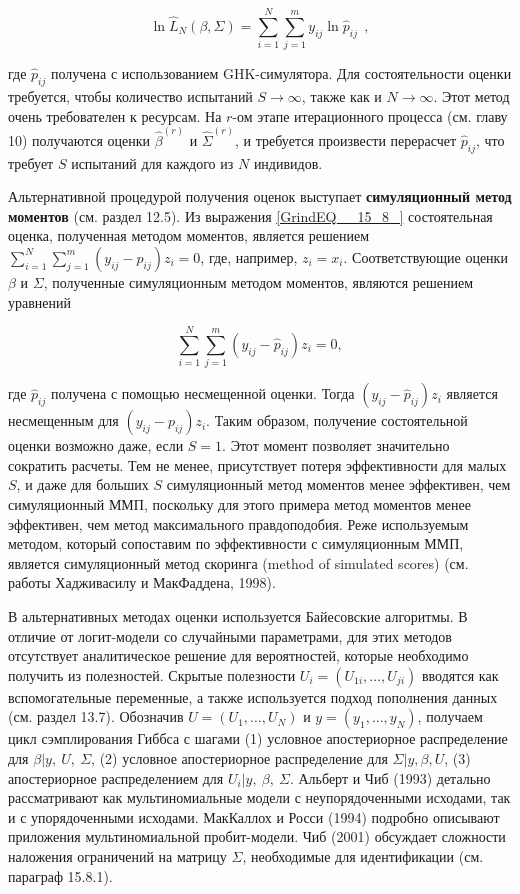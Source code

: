 \[{\ln  {\hat{L}}_N(\beta ,\Sigma )=\sum^N_{i=1}{\sum^m_{j=1}{y_{ij}{\ln  {\hat{p}}_{ij}\ }}}\ },\] 

где ${\hat{p}}_{ij}$ получена с использованием GHK-симулятора. Для состоятельности оценки требуется, чтобы количество испытаний  $S\to \infty $, также как и $N\to \infty $. Этот метод очень требователен к ресурсам. На $r$-ом этапе итерационного процесса (см. главу 10) получаются оценки ${\widehat{\beta }}^{(r)}$ и ${\widehat{\Sigma }}^{(r)}$, и требуется произвести перерасчет ${\hat{p}}_{ij}$, что требует $S$ испытаний для каждого из $N$ индивидов.

Альтернативной процедурой получения оценок выступает \textbf{симуляционный метод моментов} (см. раздел 12.5). Из выражения \eqref{GrindEQ__15_8_} состоятельная оценка, полученная методом моментов, является решением $\sum^N_{i=1}{\sum^m_{j=1}{\left(y_{ij}-p_{ij}\right)z_i=0}}$, где, например, $z_i=x_i$. Соответствующие оценки $\beta $ и $\Sigma $, полученные симуляционным методом моментов, являются решением уравнений

\[\sum^N_{i=1}{\sum^m_{j=1}{\left(y_{ij}-{\hat{p}}_{ij}\right)z_i=0}},\] 

где ${\hat{p}}_{ij}$ получена с помощью несмещенной оценки. Тогда $\left(y_{ij}-{\hat{p}}_{ij}\right)z_i$ является несмещенным для $\left(y_{ij}-p_{ij}\right)z_i$. Таким образом, получение состоятельной оценки возможно даже, если $S=1$. Этот момент позволяет значительно сократить расчеты. Тем не менее, присутствует потеря эффективности для малых $S$, и даже для больших $S$ симуляционный метод моментов менее эффективен, чем симуляционный ММП, поскольку для этого примера метод моментов менее эффективен, чем метод максимального правдоподобия. Реже используемым методом, который сопоставим по эффективности с симуляционным ММП, является симуляционный метод скоринга (method of simulated scores) (см. работы Хадживасилу и МакФаддена, 1998).

В альтернативных методах оценки используется Байесовские алгоритмы. В отличие от логит-модели со случайными параметрами, для этих методов отсутствует аналитическое решение для вероятностей, которые необходимо получить из полезностей. Скрытые полезности $U_i=(U_{1i},\dots ,U_{ji})$ вводятся как вспомогательные переменные, а также используется подход пополнения данных (см. раздел 13.7). Обозначив $U=(U_1,\dots ,U_N)$ и $y=(y_1,\dots ,y_N)$, получаем цикл сэмплирования Гиббса с шагами (1) условное апостериорное распределение для $\beta |y,\ U,\ \Sigma $, (2) условное апостериорное распределение для $\Sigma |y,\beta ,U$, (3) апостериорное распределением для $U_i|y,\ \beta ,\ \Sigma $. Альберт и Чиб (1993) детально рассматривают как мультиномиальные модели с неупорядоченными исходами, так и с упорядоченными исходами. МакКаллох и Росси (1994) подробно описывают приложения мультиномиальной пробит-модели. Чиб (2001) обсуждает сложности наложения ограничений на матрицу $\Sigma $, необходимые для идентификации (см. параграф 15.8.1).


